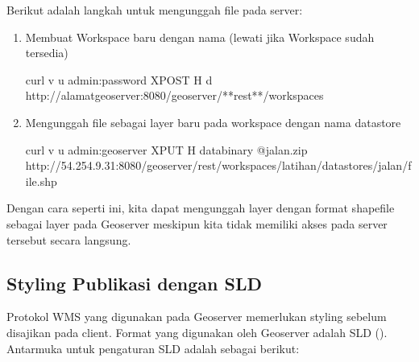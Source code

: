 \documentclass[letterpaper,10pt,english]{sphinxmanual}
\begin{document}
Berikut adalah langkah untuk mengunggah file pada server:
\begin{enumerate}
%
\item {} 
Membuat Workspace baru dengan nama  (lewati jika Workspace sudah tersedia)

\begin{sphinxVerbatim}[commandchars=\\\{\}]
curl \PYGZhy{}v \PYGZhy{}u admin:password \PYGZhy{}XPOST \PYGZhy{}H   \PYGZhy{}d  http://alamatgeoserver:8080/geoserver/**rest**/workspaces
\end{sphinxVerbatim}

\item {} 
Mengunggah file  sebagai layer baru pada workspace  dengan nama datastore 

\begin{sphinxVerbatim}[commandchars=\\\{\}]
curl \PYGZhy{}v \PYGZhy{}u admin:geoserver \PYGZhy{}XPUT \PYGZhy{}H  \PYGZhy{}\PYGZhy{}data\PYGZhy{}binary @jalan.zip http://54.254.9.31:8080/geoserver/rest/workspaces/latihan/datastores/jalan/file.shp
\end{sphinxVerbatim}

\end{enumerate}

Dengan cara seperti ini, kita dapat mengunggah layer dengan format shapefile sebagai layer pada Geoserver meskipun kita tidak memiliki akses pada server tersebut secara langsung.


\subsection{Styling Publikasi dengan SLD}
\label{\detokenize{sesi3/publikasi:styling-publikasi-dengan-sld}}
Protokol WMS yang digunakan pada Geoserver memerlukan styling sebelum disajikan pada client. Format yang digunakan oleh Geoserver adalah SLD (). Antarmuka untuk pengaturan SLD adalah sebagai berikut:

\end{document}
